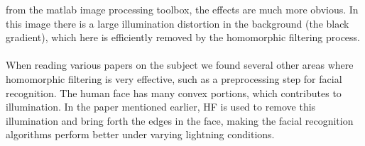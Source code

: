 		from the matlab image processing toolbox, the effects are much more obvious. 
		In this image there is a large illumination
		distortion in the background (the black gradient), which here is efficiently 
		removed by the homomorphic filtering process. \\
		\\
		When reading various papers on the
		subject we found several other areas where homomorphic filtering is very effective,
		such as a preprocessing step for facial recognition. The human face has many convex
		portions, which contributes to illumination. In the paper mentioned earlier, HF
		is used to remove this illumination and bring forth the edges in the face, making
		the facial recognition algorithms perform better under varying lightning conditions.
%  
